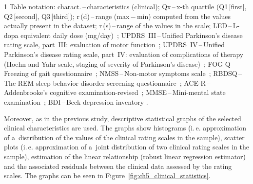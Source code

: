 \begin{table}[htb!]
\begin{threeparttable}
		\begin{tablenotes}
			\scriptsize
			\item[1] Table notation: charact.\,--\,characteristics (clinical); Qx\,--\,x-th quartile (Q1\,[first], Q2\,[second], Q3\,[third]); r\,(d)\,--\,range (max\,$-$\,min) computed from the values actually present in the dataset; r\,(s)\,--\,range of the values in the scale; LED\,--\,L-dopa equivalent daily dose (mg/day)~\cite{Lee2010}; UPDRS~III\,--\,Unified Parkinson's disease rating scale, part~III: evaluation of motor function~\cite{Fahn1987}; UPDRS~IV\,--\,Unified Parkinson's disease rating scale, part~IV: evaluation of complications of therapy (Hoehn and Yahr scale, staging of severity of Parkinson's disease)~\cite{Fahn1987}; FOG-Q\,--\,Freezing of gait questionnaire~\cite{Giladi2000}; NMSS\,--\,Non-motor symptoms scale~\cite{Chaudhuri2007}; RBDSQ\,--\,The REM sleep behavior disorder screening questionnaire~\cite{Stiasny2007}; ACE-R\,--\,Addenbrooke's cognitive examination-revised~\cite{Larner2007}; MMSE\,--\,Mini-mental state examination~\cite{Folstein1975}; BDI\,--\,Beck depression inventory \cite{Beck2000, Beck1961}.
		\end{tablenotes}
	\end{threeparttable}
\end{table}

Moreover, as in the previous study, descriptive statistical graphs of the selected clinical characteristics are used. The graphs show histograms (i.\,e. approximation of a~distribution of the values of the clinical rating scales in the sample), scatter plots (i.\,e. approximation of a~joint distribution of two clinical rating scales in the sample), estimation of the linear relationship (robust linear regression estimator) and the associated residuals between the clinical data assessed by the rating scales. The graphs can be seen in Figure~\ref{fig:ch5_clinical_statistics}.

